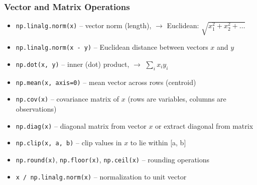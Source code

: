 \documentclass{article}
\begin{document}
\subsubsection*{Vector and Matrix Operations}
\begin{itemize}
    \item \texttt{np.linalg.norm(x)} -- vector norm (length), \texttt{$\rightarrow$} Euclidean: $\sqrt{x_1^2 + x_2^2 + \dots}$  
    \item \texttt{np.linalg.norm(x - y)} -- Euclidean distance between vectors $x$ and $y$
    \item \texttt{np.dot(x, y)} -- inner (dot) product, \texttt{$\rightarrow$} $\sum_i x_i y_i$
    \item \texttt{np.mean(x, axis=0)} -- mean vector across rows (centroid)
    \item \texttt{np.cov(x)} -- covariance matrix of $x$ (rows are variables, columns are observations)
    \item \texttt{np.diag(x)} -- diagonal matrix from vector $x$ or extract diagonal from matrix
    \item \texttt{np.clip(x, a, b)} -- clip values in $x$ to lie within [a, b]
    \item \texttt{np.round(x)}, \texttt{np.floor(x)}, \texttt{np.ceil(x)} -- rounding operations
    \item \texttt{x / np.linalg.norm(x)} -- normalization to unit vector
\end{itemize}
\end{document}
